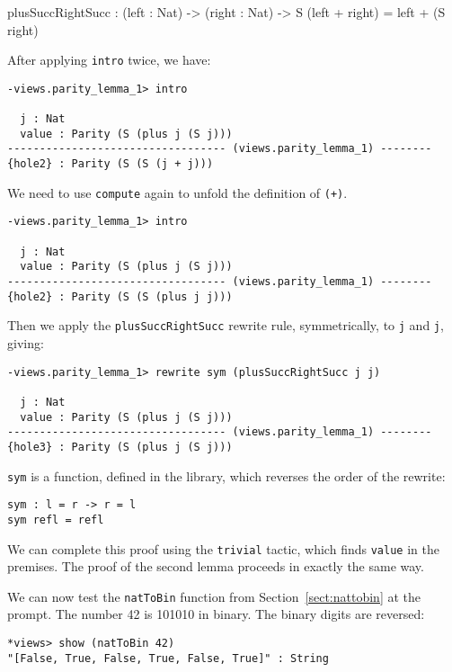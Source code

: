 \begin{code}
plusSuccRightSucc : (left : Nat) -> (right : Nat) ->
  S (left + right) = left + (S right)
\end{code}

\noindent
After applying \texttt{intro} twice, we have:

\begin{lstlisting}
-views.parity_lemma_1> intro 

  j : Nat
  value : Parity (S (plus j (S j)))
---------------------------------- (views.parity_lemma_1) --------
{hole2} : Parity (S (S (j + j)))
\end{lstlisting}

\noindent
We need to use \texttt{compute} again to unfold the definition of \texttt{(+)}.

\begin{lstlisting}
-views.parity_lemma_1> intro 

  j : Nat
  value : Parity (S (plus j (S j)))
---------------------------------- (views.parity_lemma_1) --------
{hole2} : Parity (S (S (plus j j)))
\end{lstlisting}

\noindent
Then we apply the \texttt{plusSuccRightSucc} rewrite rule, symmetrically, to \texttt{j} and \texttt{j}, giving:

\begin{lstlisting}
-views.parity_lemma_1> rewrite sym (plusSuccRightSucc j j) 
 
  j : Nat
  value : Parity (S (plus j (S j)))
---------------------------------- (views.parity_lemma_1) --------
{hole3} : Parity (S (plus j (S j)))
\end{lstlisting}

\noindent
\texttt{sym} is a function, defined in the library, which reverses the order of the rewrite:

\begin{lstlisting}
sym : l = r -> r = l
sym refl = refl
\end{lstlisting} 

\noindent
We can complete this proof using the \texttt{trivial} tactic, which finds  \texttt{value} in the premises.
The proof of the second lemma proceeds in exactly the same way.

We can now test the \texttt{natToBin} function from Section~\ref{sect:nattobin} at the prompt.
The number 42 is 101010 in binary.
The binary digits are reversed:

\begin{lstlisting}
*views> show (natToBin 42)
"[False, True, False, True, False, True]" : String
\end{lstlisting}


